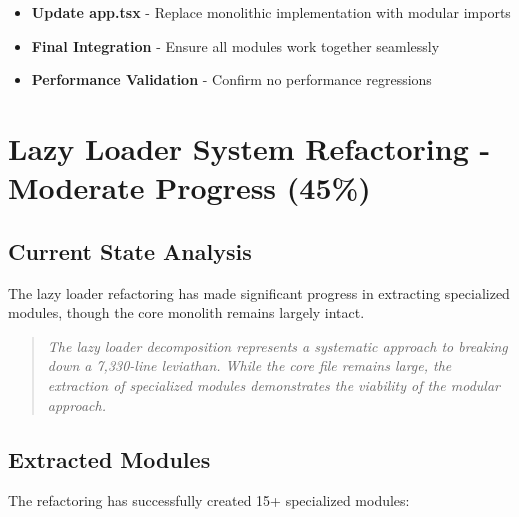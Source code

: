 \documentclass[11pt]{article}
\begin{document}
\begin{itemize}
\item \textbf{Update app.tsx} - Replace monolithic implementation with modular imports
\item \textbf{Final Integration} - Ensure all modules work together seamlessly
\item \textbf{Performance Validation} - Confirm no performance regressions
\end{itemize}

\section{Lazy Loader System Refactoring - Moderate Progress (45\%)}

\subsection{Current State Analysis}

The lazy loader refactoring has made significant progress in extracting specialized modules, though the core monolith remains largely intact.

\begin{quote}
\emph{The lazy loader decomposition represents a systematic approach to breaking down a 7,330-line leviathan. While the core file remains large, the extraction of specialized modules demonstrates the viability of the modular approach.}
\end{quote}

\subsection{Extracted Modules}

The refactoring has successfully created 15+ specialized modules:
\end{document}
